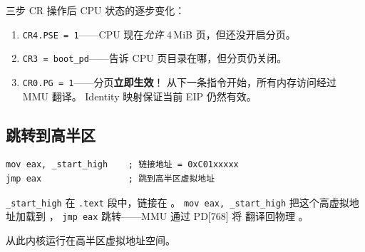 \begin{cpustate}
三步 CR 操作后 CPU 状态的逐步变化：
\begin{enumerate}
  \item \texttt{CR4.PSE = 1}——CPU 现在\emph{允许} 4\,MiB 页，但还没开启分页。
  \item \texttt{CR3 = boot\_pd}——告诉 CPU 页目录在哪，但分页仍关闭。
  \item \texttt{CR0.PG = 1}——分页\textbf{立即生效}！
        从下一条指令开始，所有内存访问经过 MMU 翻译。
        Identity 映射保证当前 EIP 仍然有效。
\end{enumerate}
\end{cpustate}

\subsection{跳转到高半区}

\begin{lstlisting}[style=nasmstyle]
mov eax, _start_high    ; 链接地址 = 0xC01xxxxx
jmp eax                 ; 跳到高半区虚拟地址
\end{lstlisting}

\texttt{\_start\_high} 在 \texttt{.text} 段中，链接在 。
\texttt{mov eax, \_start\_high} 把这个高虚拟地址加载到 ，
\texttt{jmp eax} 跳转——MMU 通过 PD[768] 将  翻译回物理 。

从此内核运行在高半区虚拟地址空间。


